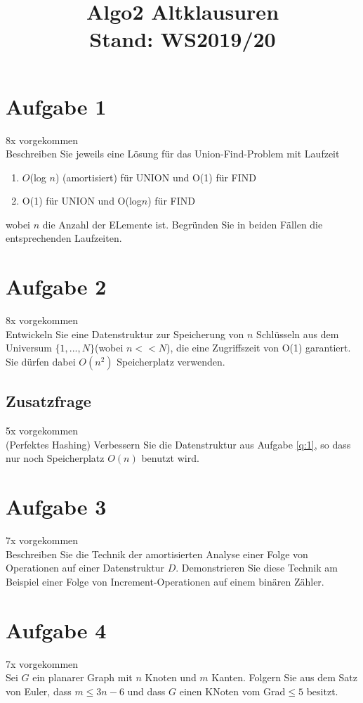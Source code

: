\documentclass[10pt,a4paper]{article}
\author{}
\date{}
\title{{\Huge \textbf{Algo2 Altklausuren}} \\ Stand: WS2019/20}
\begin{document}
	\maketitle
	
\section*{Aufgabe 1} 
	8x vorgekommen \\
	Beschreiben Sie jeweils eine Lösung für das Union-Find-Problem mit Laufzeit
	\begin{enumerate}
		\item $O$(log $n$) (amortisiert) für UNION und O(1) für FIND
		\item O(1) für UNION und O(log$n$) für FIND
	\end{enumerate}	
	wobei $n$ die Anzahl der ELemente ist. Begründen Sie in beiden Fällen die entsprechenden Laufzeiten.
	
\section*{Aufgabe 2}\label{q:1} 
	8x vorgekommen \\
	Entwickeln Sie eine Datenstruktur zur Speicherung von $n$ Schlüsseln aus dem Universum $\{1,...,N\}$(wobei $n<<N$), die eine Zugriffszeit von O(1) garantiert. Sie dürfen dabei $O(n^2)$ Speicherplatz verwenden.
\subsection*{Zusatzfrage} 
	5x vorgekommen \\
	(Perfektes Hashing) Verbessern Sie die Datenstruktur aus Aufgabe \ref{q:1}, so dass nur noch Speicherplatz $O(n)$ benutzt wird.
	
\section*{Aufgabe 3} 
	7x vorgekommen \\
	Beschreiben Sie die Technik der amortisierten Analyse einer Folge von Operationen auf einer Datenstruktur $D$. Demonstrieren Sie diese Technik am Beispiel einer Folge von Increment-Operationen auf einem binären Zähler.
	
\section*{Aufgabe 4}\label{q:2}
	7x vorgekommen \\
	Sei $G$ ein planarer Graph mit $n$ Knoten und $m$ Kanten. Folgern Sie aus dem Satz von Euler, dass $m\leq3n-6$ und dass $G$ einen KNoten vom Grad$\leq5$ besitzt.
\end{document}
